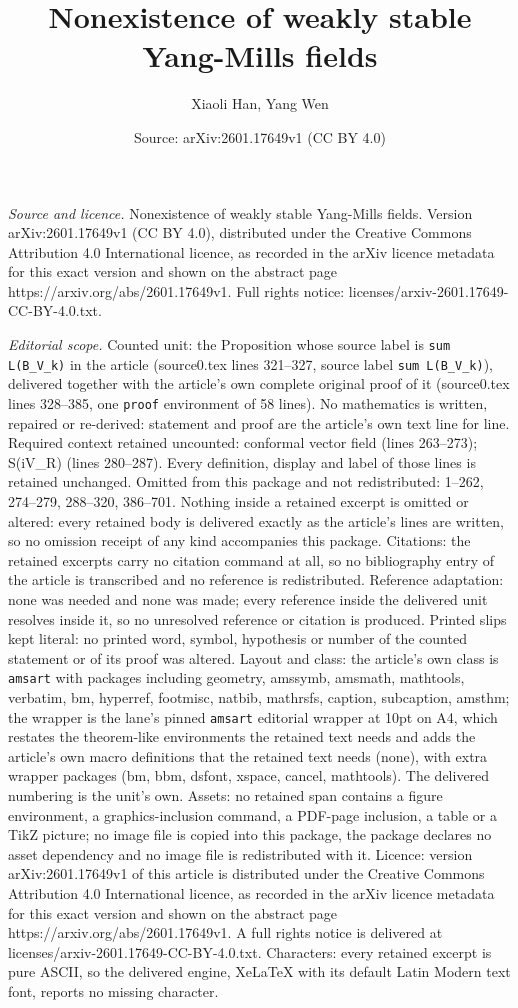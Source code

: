 \documentclass[10pt,a4paper]{amsart}
\title[Nonexistence of weakly stable Yang-Mills fields]{Nonexistence of weakly stable Yang-Mills fields}
\author{Xiaoli Han, Yang Wen}
\date{Source: arXiv:2601.17649v1 (CC BY 4.0)}
\begin{document}
\maketitle

\noindent\emph{Source and licence.} Nonexistence of weakly stable Yang-Mills fields. Version arXiv:2601.17649v1 (CC BY 4.0), distributed under the Creative Commons Attribution 4.0 International licence, as recorded in the arXiv licence metadata for this exact version and shown on the abstract page https://arxiv.org/abs/2601.17649v1. Full rights notice: licenses/arxiv-2601.17649-CC-BY-4.0.txt.\par\smallskip

\noindent\textit{Editorial scope.} Counted unit: the Proposition whose source label is \texttt{sum L(B\_V\_k)} in the article (source0.tex lines 321--327, source label \texttt{sum L(B\_V\_k)}), delivered together with the article's own complete original proof of it (source0.tex lines 328--385, one \texttt{proof} environment of 58 lines). No mathematics is written, repaired or re-derived: statement and proof are the article's own text line for line. Required context retained uncounted: conformal vector field (lines 263--273); S(iV\_R) (lines 280--287). Every definition, display and label of those lines is retained unchanged. Omitted from this package and not redistributed: 1--262, 274--279, 288--320, 386--701. Nothing inside a retained excerpt is omitted or altered: every retained body is delivered exactly as the article's lines are written, so no omission receipt of any kind accompanies this package. Citations: the retained excerpts carry no citation command at all, so no bibliography entry of the article is transcribed and no reference is redistributed. Reference adaptation: none was needed and none was made; every reference inside the delivered unit resolves inside it, so no unresolved reference or citation is produced. Printed slips kept literal: no printed word, symbol, hypothesis or number of the counted statement or of its proof was altered. Layout and class: the article's own class is \texttt{amsart} with packages including geometry, amssymb, amsmath, mathtools, verbatim, bm, hyperref, footmisc, natbib, mathrsfs, caption, subcaption, amsthm; the wrapper is the lane's pinned \texttt{amsart} editorial wrapper at 10pt on A4, which restates the theorem-like environments the retained text needs and adds the article's own macro definitions that the retained text needs (none), with extra wrapper packages (bm, bbm, dsfont, xspace, cancel, mathtools). The delivered numbering is the unit's own. Assets: no retained span contains a figure environment, a graphics-inclusion command, a PDF-page inclusion, a table or a TikZ picture; no image file is copied into this package, the package declares no asset dependency and no image file is redistributed with it. Licence: version arXiv:2601.17649v1 of this article is distributed under the Creative Commons Attribution 4.0 International licence, as recorded in the arXiv licence metadata for this exact version and shown on the abstract page https://arxiv.org/abs/2601.17649v1. A full rights notice is delivered at licenses/arxiv-2601.17649-CC-BY-4.0.txt. Characters: every retained excerpt is pure ASCII, so the delivered engine, XeLaTeX with its default Latin Modern text font, reports no missing character.
\end{document}
